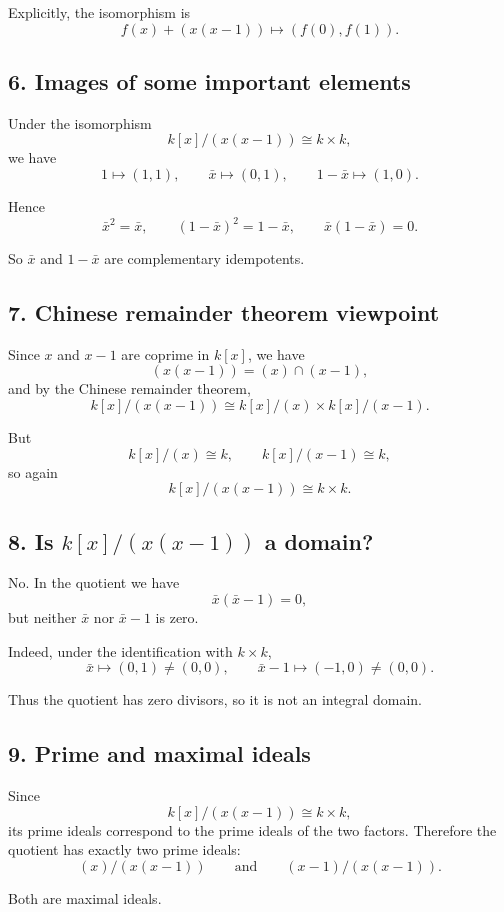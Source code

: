\documentclass[12pt,a4paper]{article}
\theoremstyle{notespace}
\begin{document}
Explicitly, the isomorphism is
\[
f(x)+(x(x-1))
\longmapsto
(f(0),f(1)).
\]

\subsection{6. Images of some important elements}

Under the isomorphism
\[
k[x]/(x(x-1))\cong k\times k,
\]
we have
\[
1\longmapsto (1,1),
\qquad
\bar x\longmapsto (0,1),
\qquad
1-\bar x\longmapsto (1,0).
\]

Hence
\[
\bar x^2=\bar x,
\qquad
(1-\bar x)^2=1-\bar x,
\qquad
\bar x(1-\bar x)=0.
\]

So \(\bar x\) and \(1-\bar x\) are complementary idempotents.

\subsection{7. Chinese remainder theorem viewpoint}

Since \(x\) and \(x-1\) are coprime in \(k[x]\), we have
\[
(x(x-1))=(x)\cap (x-1),
\]
and by the Chinese remainder theorem,
\[
k[x]/(x(x-1))
\cong
k[x]/(x)\times k[x]/(x-1).
\]

But
\[
k[x]/(x)\cong k,
\qquad
k[x]/(x-1)\cong k,
\]
so again
\[
k[x]/(x(x-1))\cong k\times k.
\]

\subsection{8. Is \(k[x]/(x(x-1))\) a domain?}

No. In the quotient we have
\[
\bar x(\bar x-1)=0,
\]
but neither \(\bar x\) nor \(\bar x-1\) is zero.

Indeed, under the identification with \(k\times k\),
\[
\bar x\mapsto (0,1)\neq (0,0),
\qquad
\bar x-1\mapsto (-1,0)\neq (0,0).
\]

Thus the quotient has zero divisors, so it is not an integral domain.

\subsection{9. Prime and maximal ideals}

Since
\[
k[x]/(x(x-1))\cong k\times k,
\]
its prime ideals correspond to the prime ideals of the two factors. Therefore the quotient has exactly two prime ideals:
\[
(x)/(x(x-1))
\qquad\text{and}\qquad
(x-1)/(x(x-1)).
\]

Both are maximal ideals.
\end{document}
